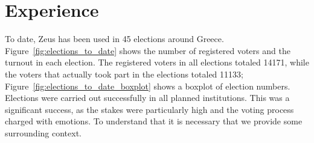 \documentclass[letterpaper,10pt]{article}
\begin{document}






\section{Experience}
\label{sec:experience}

To date, Zeus has been used in 45 elections around Greece.
Figure~\ref{fig:elections_to_date} shows the number of registered
voters and the turnout in each election. The
registered voters in all elections totaled 14171, while the voters
that actually took part in the elections totaled 11133;
Figure~\ref{fig:elections_to_date_boxplot} shows a boxplot of
election numbers. Elections were carried out successfully in all
planned institutions. This was a significant success, as the stakes
were particularly high and the voting process charged with emotions.
To understand that it is necessary that we provide some surrounding
context.
\end{document}
